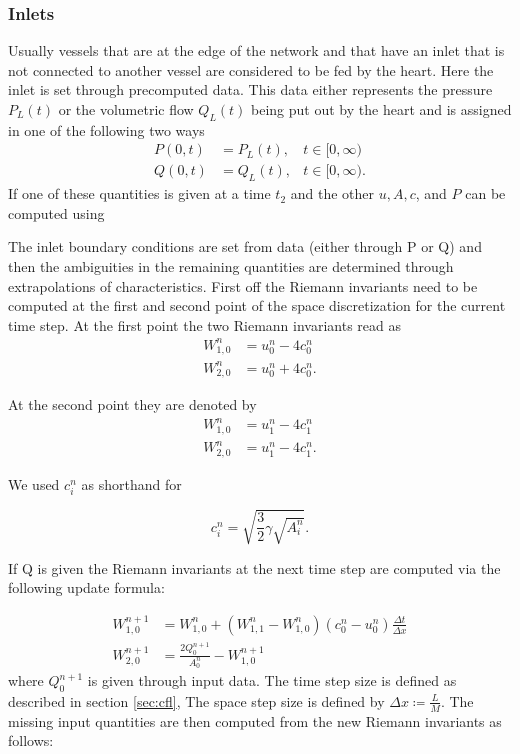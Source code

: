 \documentclass[a4paper, oneside]{discothesis}
\begin{document}
\subsubsection{Inlets}\label{sssec:inlets}
Usually vessels that are at the edge of the network and that have an inlet that is not connected to another vessel are considered to be fed by the heart.
Here the inlet is set through precomputed data.
This data either represents the pressure $P_L(t)$ or the volumetric flow $Q_L(t)$ being put out by the heart and is assigned in one of the following two ways
\begin{align}
	P(0,t) &= P_L(t), &t \in [0,\infty) \\
	Q(0,t) &= Q_L(t), &t \in [0,\infty).
\end{align}
If one of these quantities is given at a time $t_2$ and the other $u, A, c$, and $P$ can be computed using 

	

The inlet boundary conditions are set from data (either through P or Q) and then the ambiguities in the remaining quantities are determined through extrapolations of characteristics.
First off the Riemann invariants need to be computed at the first and second point of the space discretization for the current time step.
At the first point the two Riemann invariants read as
\begin{align}
	W_{1,0}^n &= u^n_0 - 4c^n_0\\
	W_{2,0}^n &= u^n_0 + 4c^n_0.
\end{align}

At the second point they are denoted by
\begin{align}
	W_{1,0}^n &= u^n_1 - 4c^n_1\\
	W_{2,0}^n &= u^n_1 - 4c^n_1.
\end{align}

We used $c_i^n$ as shorthand for

\begin{equation}
	c^n_i = \sqrt{\frac{3}{2}\gamma\sqrt{A^n_i}}.
\end{equation}

If Q is given the Riemann invariants at the next time step are computed via the following update formula:

\begin{align}
	W_{1,0}^{n+1} &= W^n_{1,0} + (W^n_{1,1} - W^n_{1,0})(c^n_0-u^n_0) \frac{\Delta t}{\Delta x} \label{update1a}\\
	W_{2,0}^{n+1} &= \frac{2Q^{n+1}_0}{A^n_0} - W^{n+1}_{1,0} \label{update2a}
\end{align}
where $Q^{n+1}_0$ is given through input data.
The time step size is defined as described in section \ref{sec:cfl},
The space step size is defined by $\Delta x \coloneqq \frac{L}{M}$.
The missing input quantities are then computed from the new Riemann invariants as follows:
\end{document}

